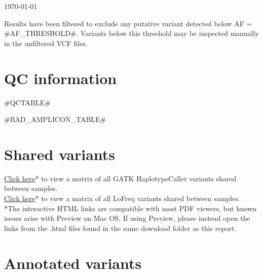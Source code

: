 \documentclass[11pt, a4paper, landscape]{article}
\newcommand{\lightfont}{\fontseries{l}\selectfont}
\renewcommand{\arraystretch}{1.5}
\begin{document}
\noindent
{\fontsize{16pt}{16pt}\selectfont {}}

\medskip
\noindent
{\lightfont \today}

\medskip
\noindent Results have been filtered to exclude any putative variant detected below AF = {{#AF_THRESHOLD#}}. Variants below this threshold may be inspected manually in the unfiltered VCF files.

\section{QC information}

\footnotesize
{{#QCTABLE#}}


\normalsize
{{#BAD_AMPLICON_TABLE#}}

\newpage
\section{Shared variants}

\href{GATKHCvariants.html}{Click here}* to view a matrix of all GATK HaplotypeCaller variants shared between samples.\\
\href{LoFreqvariants.html}{Click here}* to view a matrix of all LoFreq variants shared between samples. \\
\scriptsize{*The interactive HTML links are compatible with most PDF viewers, but known issues arise with Preview on Mac OS. If using Preview, please instead open the links from the .html files found in the same download folder as this report.}

\renewcommand{\arraystretch}{1.4}
\section{Annotated variants}
\footnotesize
\end{document}
